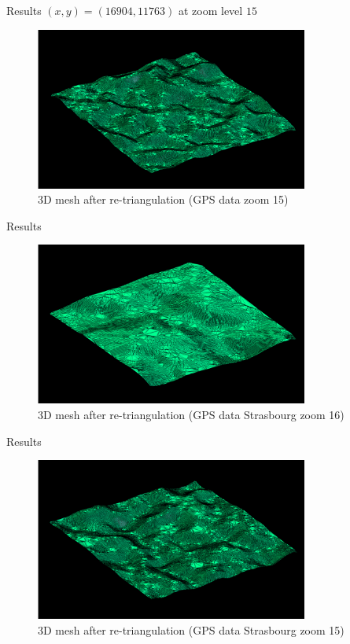 \documentclass[10pt]{beamer}
\begin{document}
\begin{frame}{Results}
  \centering
  \Large
  $(x, y) = (16904, 11763)$ at zoom level $15$
  \begin{figure}[H]
    \centering
    \includegraphics[width=0.8\textwidth]{images/constrained-grenoble-15-1.png}
    \caption{3D mesh after re-triangulation (GPS data zoom 15)}
\end{figure}
\end{frame}

\begin{frame}{Results}
  \begin{figure}[H]
    \centering
    \includegraphics[width=0.8\textwidth]{images/constrained-strasbourg-16.png}
    \caption{3D mesh after re-triangulation (GPS data Strasbourg zoom 16)}
\end{figure}
\end{frame}

\begin{frame}{Results}
  \begin{figure}[H]
    \centering
    \includegraphics[width=0.8\textwidth]{images/constrained-strasbourg-15.png}
    \caption{3D mesh after re-triangulation (GPS data Strasbourg zoom 15)}
\end{figure}
\end{frame}
\end{document}
